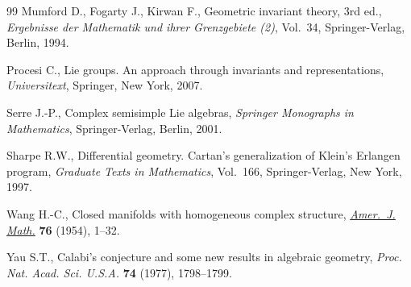 \documentclass[pdftex]{sigma}
\begin{document}
\begin{thebibliography}{99}
Mumford D., Fogarty J.,  Kirwan F.,
 Geometric invariant theory,  3rd ed., {\em Ergebnisse der
  Mathematik und ihrer Grenzgebiete (2)}, Vol.~34,
 Springer-Verlag, Berlin,   1994.

 Procesi C.,
Lie groups. An approach through invariants and representations, {\it Universitext}, Springer, New York, 2007.

 Serre J.-P.,
 Complex semisimple Lie algebras,
{\it Springer Monographs in Mathematics}, Springer-Verlag, Berlin, 2001.


 Sharpe R.W.,
Dif\/ferential geometry. Cartan's generalization of Klein's Erlangen program,
{\em Graduate Texts in Mathematics}, Vol.~166,
 Springer-Verlag, New York, 1997.

 Wang H.-C.,
 Closed manifolds with homogeneous complex structure,
\href{http://dx.doi.org/10.2307/2372397}{{\em Amer.~J. Math.}} {\bf 76} (1954), 1--32.

 Yau S.T.,
 Calabi's conjecture and some new results in algebraic geometry,
 {\em Proc. Nat. Acad. Sci. U.S.A.} {\bf 74} (1977), 1798--1799.

\end{thebibliography} \LastPageEnding
\end{document}
